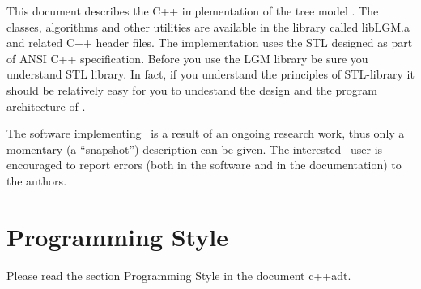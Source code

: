 This document  describes   the C++  implementation of the   tree model
\linebreak \lignum.  The  classes, algorithms and  other utilities are
available in the library called libLGM.a and related C++ header files.
The implementation  uses the   STL   designed  as part of   ANSI   C++
specification.  Before you use the LGM library  be sure you understand
STL library. In fact, if you  understand the principles of STL-library
it should be relatively easy  for you to  undestand the design and the
program architecture of \lignum.

The software implementing \lignum\ is a result  of an ongoing research
work,  thus only  a   momentary  (a ``snapshot'') description   can be
given. The interested  \lignum\ user  is  encouraged to  report errors
(both in the software and in the documentation) to the authors.


\section{Programming Style}
Please read the section Programming Style in the document c++adt.

